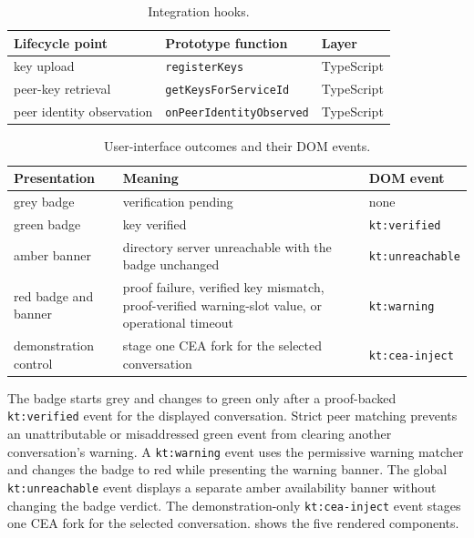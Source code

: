 \begin{table}[ht]
\centering
\caption{Integration hooks.}
\label{tab:apiref-hooks}
\small
\begin{tabular}{@{}lll@{}}
\toprule
Lifecycle point & Prototype function & Layer \\
\midrule
key upload & \texttt{registerKeys} & TypeScript \\
peer-key retrieval & \texttt{getKeysForServiceId} & TypeScript \\
peer identity observation & \texttt{onPeerIdentityObserved} & TypeScript \\
\bottomrule
\end{tabular}
\end{table}

\begin{table}[ht]
\centering
\caption{User-interface outcomes and their DOM events.}
\label{tab:apiref-events}
\small
\begin{tabularx}{\textwidth}{@{}>{\raggedright\arraybackslash}p{3.5cm}X p{3.2cm}@{}}
\toprule
Presentation & Meaning & DOM event \\
\midrule
grey badge & verification pending & none \\
green badge & key verified & \texttt{kt:verified} \\
amber banner & directory server unreachable with the badge unchanged & \texttt{kt:unreachable} \\
red badge and banner &
proof failure, verified key mismatch, proof-verified warning-slot value, or operational timeout &
\texttt{kt:warning} \\
demonstration control & stage one CEA fork for the selected conversation & \texttt{kt:cea-inject} \\
\bottomrule
\end{tabularx}
\end{table}

The badge starts grey and changes to green only after a proof-backed \texttt{kt:verified} event for
the displayed conversation. Strict peer matching prevents an unattributable or misaddressed green event
from clearing another conversation's warning. A \texttt{kt:warning} event uses the permissive warning
matcher and changes the badge to red while presenting the warning banner. The global
\texttt{kt:unreachable} event displays a separate amber availability banner without changing the
badge verdict. The demonstration-only \texttt{kt:cea-inject} event stages one CEA fork for the
selected conversation.  shows the five rendered components.

